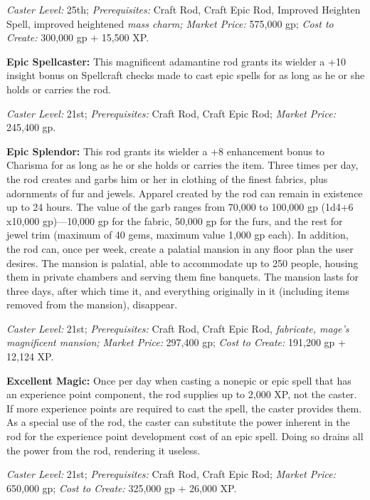 \documentclass{article}
\begin{document}
\textit{Caster Level: }25th; \textit{Prerequisites: }Craft Rod, Craft Epic Rod, 
Improved Heighten Spell, improved heightened \textit{mass charm; Market Price: 
}575,000 gp; \textit{Cost to Create: }300,000 gp + 15,500 XP. 

\textbf{Epic Spellcaster: }This magnificent adamantine rod grants its wielder a 
+10 insight bonus on Spellcraft checks made to cast epic spells for as long as 
he or she holds or carries the rod. 

\textit{Caster Level: }21st; \textit{Prerequisites: }Craft Rod, Craft Epic Rod; 
\textit{Market Price: }245,400 gp. 

\textbf{Epic Splendor: }This rod grants its wielder a +8 enhancement bonus to Charisma 
for as long as he or she holds or carries the item. Three times per day, the rod 
creates and garbs him or her in clothing of the finest fabrics, plus adornments 
of fur and jewels. Apparel created by the rod can remain in existence up to 24 
hours. The value of the garb ranges from 70,000 to 100,000 gp (1d4+6 x10,000 gp)---10,000 
gp for the fabric, 50,000 gp for the furs, and the rest for jewel trim (maximum 
of 40 gems, maximum value 1,000 gp each). In addition, the rod can, once per week, 
create a palatial mansion in any floor plan the user desires. The mansion is palatial, 
able to accommodate up to 250 people, housing them in private chambers and serving 
them fine banquets. The mansion lasts for three days, after which time it, and 
everything originally in it (including items removed from the mansion), disappear. 

\textit{Caster Level: }21st; \textit{Prerequisites: }Craft Rod, Craft Epic Rod, 
\textit{fabricate, mage's magnificent mansion; Market Price: }297,400 gp; \textit{Cost 
to Create: }191,200 gp + 12,124 XP. 

\textbf{Excellent Magic: }Once per day when casting a nonepic or epic spell that 
has an experience point component, the rod supplies up to 2,000 XP, not the caster. 
If more experience points are required to cast the spell, the caster provides them. 
As a special use of the rod, the caster can substitute the power inherent in the 
rod for the experience point development cost of an epic spell. Doing so drains 
all the power from the rod, rendering it useless. 

\textit{Caster Level: }21st; \textit{Prerequisites: }Craft Rod, Craft Epic Rod; 
\textit{Market Price: }650,000 gp; \textit{Cost to Create: }325,000 gp + 26,000 
XP. 
\end{document}
